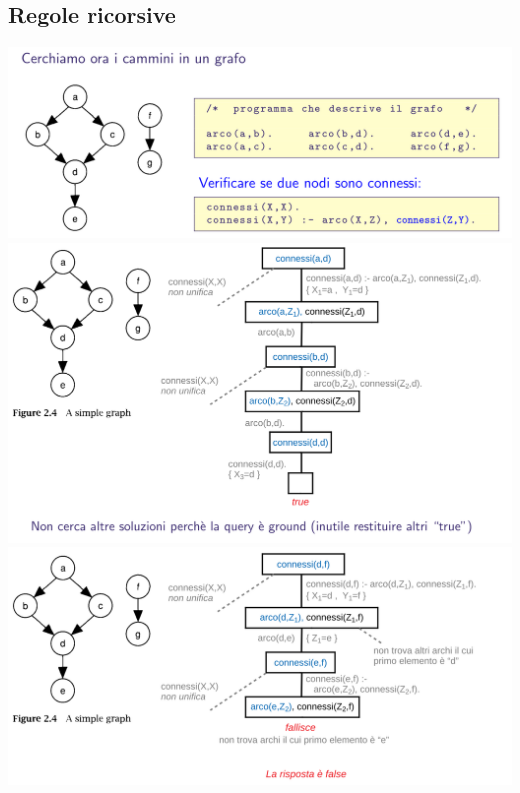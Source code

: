 \documentclass[10pt]{article}
\begin{document}
\subsection{Regole ricorsive}
\includegraphics[scale=0.25]{Immagini/pl26.png}
\\
\includegraphics[scale=0.25]{Immagini/pl27.png}
\\
\includegraphics[scale=0.25]{Immagini/pl28.png}
\end{document}

